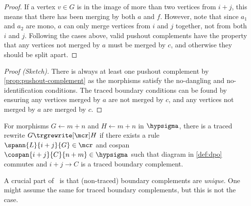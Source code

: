 {\begin{proof}
        If a vertex \(v \in G\) is in the image of more than two vertices from
        \(i + j\), this means that there has been merging by both \(a\) and
        \(f\).
        However, note that since \(a_1\) and \(a_2\) are mono, \(a\) can only
        merge vertices from \(i\) and \(j\) together, not from both \(i\) and
        \(j\).
        Following the cases above, valid pushout complements have the property
        that any vertices not merged by \(a\) must be merged by \(c\), and
        otherwise they should be split apart.
    \end{proof}
}{
    \begin{proof}[Proof (Sketch)]
        There is always at least one pushout complement by
        \cref{prop:pushout-complement} as the morphisms satisfy the no-dangling
        and no-identification conditions.
        The traced boundary conditions can be found by ensuring any
        vertices merged by \(a\) are not merged by \(c\), and any vertices
        not merged by \(a\) are merged by \(c\).
    \end{proof}
}


\begin{definition}
    For morphisms \(G \leftarrow m+n\) and \(H \leftarrow m+n\) in
    \(\hypsigma\), there is a traced rewrite \(G \trgrewrite[\mcr] H\) if there
    exists a rule \(
        \spann{L}{i+j}{G} \in \mcr
    \) and cospan \(
        \cospan{i+j}{C}{n+m} \in \hypsigma
    \) such that diagram in \cref{def:dpo} commutes and \(i+j \to C\) is a
    traced boundary complement.
\end{definition}



A crucial part of~\cite{bonchi2022string} is that (non-traced) boundary
complements are \emph{unique}.
One might assume the same for traced boundary complements, but this is not the
case.

